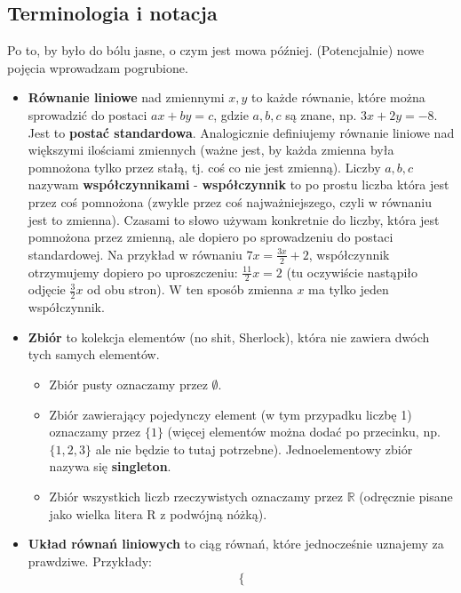 \documentclass{article}
\theoremstyle{remark}
\begin{document}
\subsection{Terminologia i notacja}
Po to, by było do bólu jasne, o czym jest mowa później.
(Potencjalnie) nowe pojęcia wprowadzam pogrubione.
\begin{itemize}
  \item \textbf{Równanie liniowe} nad zmiennymi $x, y$
  to każde równanie, które można sprowadzić do postaci
  $ax + by = c$, gdzie $a, b, c$ są znane, np. $3x+2y=-8$.
  Jest to \textbf{postać standardowa}.
  Analogicznie definiujemy równanie liniowe
  nad większymi ilościami zmiennych
  (ważne jest, by każda zmienna była pomnożona tylko przez
   stałą, tj. coś co nie jest zmienną).
  \subitem Liczby $a, b, c$ nazywam \textbf{współczynnikami} -
  \textbf{współczynnik} to po prostu liczba która jest przez coś pomnożona
  (zwykle przez coś najważniejszego, czyli w równaniu jest to zmienna).
  Czasami to słowo używam konkretnie do liczby, która jest pomnożona przez zmienną,
  ale dopiero po sprowadzeniu do postaci standardowej.
  Na przykład w równaniu $7x = \tfrac{3x}2 + 2$, współczynnik otrzymujemy dopiero po
   uproszczeniu:
  $\frac{11}2x = 2$ (tu oczywiście nastąpiło odjęcie $\frac32x$ od obu stron).
  W ten sposób zmienna $x$ ma tylko jeden współczynnik.
  \item \textbf{Zbiór} to kolekcja elementów (no shit, Sherlock),
    która nie zawiera dwóch tych samych elementów.
  \begin{itemize}
    \item Zbiór pusty oznaczamy przez $\emptyset$.
    \item Zbiór zawierający pojedynczy element (w tym przypadku liczbę 1)
  oznaczamy przez $\{1\}$ (więcej elementów można dodać po przecinku, np. $\{1, 2, 3\}$
  ale nie będzie to tutaj potrzebne). Jednoelementowy zbiór nazywa się \textbf{singleton}.
    \item Zbiór wszystkich liczb rzeczywistych oznaczamy przez $\mathbb R$ 
  (odręcznie pisane jako wielka litera R z podwójną nóżką).
  \end{itemize}
  \item \textbf{Układ równań liniowych} to ciąg równań, które jednocześnie uznajemy za prawdziwe.
  Przykłady:
  \begin{align*}
    &\left\{
    \begin{array}{lllll}

\end{array}
\end{align*}
\end{itemize}
\end{document}
